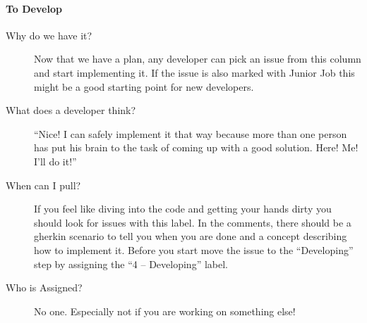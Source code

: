 \documentclass[letterpaper,10pt,english]{sphinxmanual}
\begin{document}
\paragraph{To Develop}
\label{bugtracker/kanban:to-develop}\begin{description}
\item[{Why do we have it?}] \leavevmode
Now that we have a plan, any developer can pick an issue from this column and
start implementing it. If the issue is also marked with Junior Job this might
be a good starting point for new developers.

\item[{What does a developer think?}] \leavevmode
``Nice! I can safely implement it that way because more than one person has put
his brain to the task of coming up with a good solution. Here! Me! I’ll do
it!''

\item[{When can I pull?}] \leavevmode
If you feel like diving into the code and getting your hands dirty you should
look for issues with this label. In the comments, there should be a gherkin
scenario to tell you when you are done and a concept describing how to
implement it. Before you start move the issue to the “Developing” step by
assigning the ``4 – Developing'' label.

\item[{Who is Assigned?}] \leavevmode
No one. Especially not if you are working on something else!

\end{description}
\end{document}
